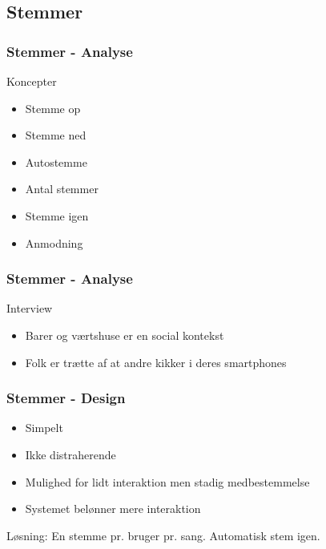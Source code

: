 \subsection{Stemmer}
\begin{frame}
	\frametitle{Stemmer - Analyse}
	Koncepter
	\begin{itemize}
		\item Stemme op
		\item Stemme ned
		\item Autostemme
		\item Antal stemmer
		\item Stemme igen
		\item Anmodning
	\end{itemize}
\end{frame}

\begin{frame}
	\frametitle{Stemmer - Analyse}
	Interview
	\begin{itemize}
		\item Barer og værtshuse er en social kontekst
		\item Folk er trætte af at andre kikker i deres smartphones
	\end{itemize}
\end{frame}

\begin{frame}
	\frametitle{Stemmer - Design}
	\begin{itemize}
		\item Simpelt
		\item Ikke distraherende
		\item Mulighed for lidt interaktion men stadig medbestemmelse
		\item Systemet belønner mere interaktion
	\end{itemize}
	Løsning: En stemme pr. bruger pr. sang. Automatisk stem igen.
\end{frame}